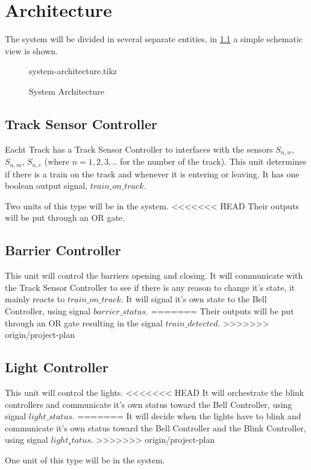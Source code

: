 \documentclass[final]{report}
\begin{document}
\chapter{Architecture}
The system will be divided in several separate entities, in \cref{fig:system-architecture} a simple schematic view is shown.

\begin{figure}[H]
	\centering
	{system-architecture.tikz}
	\caption{System Architecture}
	\label{fig:system-architecture}
\end{figure}

\section{Track Sensor Controller}
Eacht Track has a Track Sensor Controller to interfaces with the sensors $S_{n,w}$, $S_{n,m}$, $S_{n,e}$ (where $n = 1,2,3,..$ for the number of the track).
This unit determines if there is a train on the track and whenever it is entering or leaving.
It has one boolean output signal, $train\_on\_track$.

Two units of this type will be in the system.
<<<<<<< HEAD
Their outputs will be put through an OR gate.
\section{Barrier Controller}
This unit will control the barriers opening and closing.
It will communicate with the Track Sensor Controller to see if there is any reason to change it's state, it mainly reacts to $train\_on\_track$.
It will signal it's own state to the Bell Controller, using signal $barrier\_status$.
=======
Their outputs will be put through an OR gate resulting in the signal $train\_detected$.
>>>>>>> origin/project-plan

\section{Light Controller}
This unit will control the lights.
<<<<<<< HEAD
It will orchestrate the blink controllers and communicate it's own status toward the Bell Controller, using signal $light\_status$.
=======
It will decide when the lights have to blink and communicate it's own status toward the Bell Controller and the Blink Controller, using signal $light_status$.
>>>>>>> origin/project-plan

One unit of this type will be in the system.
\end{document}
